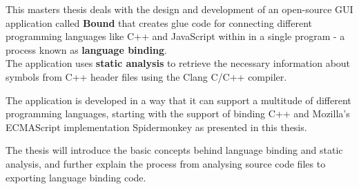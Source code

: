 \thispagestyle{empty}

This masters thesis deals with the design and development of an open-source GUI application called \textbf{Bound} that creates glue code for connecting different programming languages like C++ and JavaScript within in a single program - a process known as \textbf{language binding}.\\
The application uses \textbf{static analysis} to retrieve the necessary information about symbols from C++ header files using the Clang C/C++ compiler.

The application is developed in a way that it can support a multitude of different programming languages, starting with the support of binding C++ and Mozilla's ECMAScript implementation Spidermonkey as presented in this thesis.

The thesis will introduce the basic concepts behind language binding and static analysis, and further explain the process from analysing source code files to exporting language binding code.
